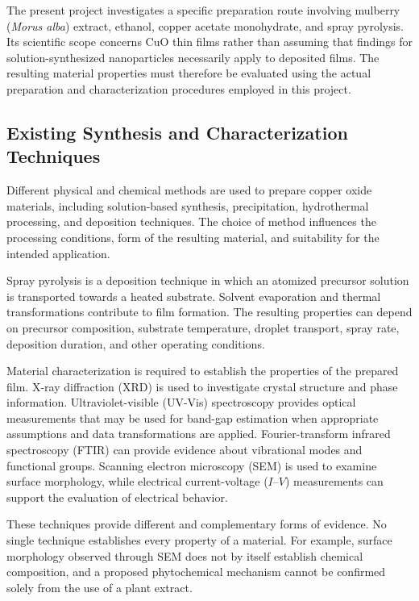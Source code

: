 \documentclass[12pt,a4paper,oneside]{report}
\begin{document}
{{{The present project investigates a specific preparation route involving mulberry (\textit{Morus alba}) extract, ethanol, copper acetate monohydrate, and spray pyrolysis. Its scientific scope concerns $\text{CuO}$ thin films rather than assuming that findings for solution-synthesized nanoparticles necessarily apply to deposited films. The resulting material properties must therefore be evaluated using the actual preparation and characterization procedures employed in this project.

\subsection{Existing Synthesis and Characterization Techniques}

Different physical and chemical methods are used to prepare copper oxide materials, including solution-based synthesis, precipitation, hydrothermal processing, and deposition techniques. The choice of method influences the processing conditions, form of the resulting material, and suitability for the intended application.

Spray pyrolysis is a deposition technique in which an atomized precursor solution is transported towards a heated substrate. Solvent evaporation and thermal transformations contribute to film formation. The resulting properties can depend on precursor composition, substrate temperature, droplet transport, spray rate, deposition duration, and other operating conditions.

Material characterization is required to establish the properties of the prepared film. X-ray diffraction (XRD) is used to investigate crystal structure and phase information. Ultraviolet-visible (UV-Vis) spectroscopy provides optical measurements that may be used for band-gap estimation when appropriate assumptions and data transformations are applied. Fourier-transform infrared spectroscopy (FTIR) can provide evidence about vibrational modes and functional groups. Scanning electron microscopy (SEM) is used to examine surface morphology, while electrical current-voltage ($I\text{--}V$) measurements can support the evaluation of electrical behavior.

These techniques provide different and complementary forms of evidence. No single technique establishes every property of a material. For example, surface morphology observed through SEM does not by itself establish chemical composition, and a proposed phytochemical mechanism cannot be confirmed solely from the use of a plant extract.

}}}
\end{document}

